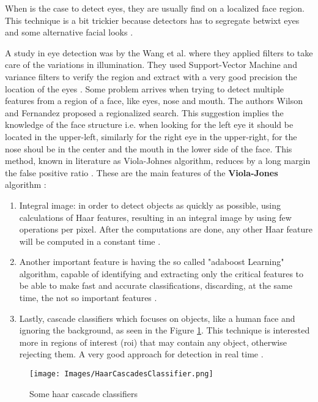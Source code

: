 When is the case to detect eyes, they are usually find on a localized face region. This technique is a bit trickier because detectors has to segregate betwixt eyes and some alternative facial looks \cite{Viola}. 

A study in eye detection was by the Wang et al. \cite{Wang} where they applied filters to take care of the variations in illumination. They used Support-Vector Machine and variance filters to verify the region and extract with a very good precision the location of the eyes \cite{Viola}. Some problem arrives when trying to detect multiple features from a region of a face, like eyes, nose and mouth. The authors Wilson and Fernandez \cite{Fernandez} proposed a regionalized search. This suggestion implies the knowledge of the face structure i.e. when looking for the left eye it should be located in the upper-left, similarly for the right eye in the upper-right, for the nose shoul be in the center and the mouth in the lower side of the face. This method, known in literature as Viola-Johnes algorithm, reduces by a long margin the false positive ratio \cite{Viola}. These are the main features of the \textbf{Viola-Jones} algorithm :
\begin{enumerate}
    \item Integral image: in order to detect objects as quickly as possible, using calculations of Haar features, resulting in an integral image by using few operations per pixel. After the computations are done, any other Haar feature will be computed in a constant time \cite{OpenViola}.
    \item Another important feature is having the so called "adaboost Learning" algorithm, capable of identifying and extracting only the critical features to be able to make fast and accurate classifications, discarding, at the same time, the not so important features \cite{OpenViola}.
    \item  Lastly, cascade classifiers which focuses on objects, like a human face and ignoring the background, as seen in the Figure \ref{fig:HaarCascadeClassifier}. This technique is interested more in regions of interest (roi) that may contain any object, otherwise rejecting them. A very good approach for detection in real time \cite{OpenViola}.
\end{enumerate}

\begin{figure}[h!]
    \centering
    \texttt{[image: Images/HaarCascadesClassifier.png]}
    \caption{Some haar cascade classifiers  \cite{OpenViola}}
    \label{fig:HaarCascadeClassifier}
\end{figure}

